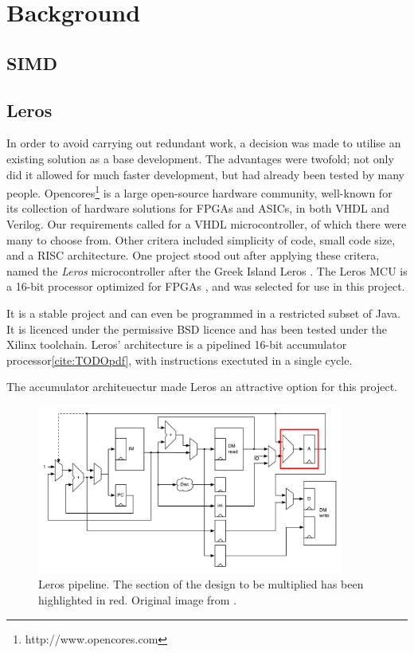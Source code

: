 \section{Background}
\subsection{SIMD}
\subsection{Leros}
In order to avoid carrying out redundant work, a decision was made to utilise an
existing solution as a base development. The advantages were twofold; not only
did it allowed for much faster development, but had already been tested by many
people. Opencores\footnote{
http://www.opencores.com
}
is a large open-source hardware community, well-known for its collection of hardware solutions for
FPGAs and ASICs, in both VHDL and Verilog. Our requirements called for a VHDL
microcontroller, of which there were many to choose from. Other critera included
simplicity of code, small code size, and a RISC architecture. One project stood out
after applying these critera, named the \emph{Leros} microcontroller after the
Greek Island Leros \cite{cite:TODO}.  The Leros MCU is a 16-bit
processor optimized for FPGAs \cite{cite:TODO}, and was selected for use in this
project.

 It is a stable
project and can even be programmed in a restricted subset of Java. It is licenced
under the permissive BSD licence and has been tested under the Xilinx toolchain.
Leros' architecture is a pipelined 16-bit accumulator processor\ref{cite:TODOpdf},
with instructions exectuted in a single cycle.

The accumulator architeuectur made Leros an attractive option for this project.

\begin{figure}[h]
\center
\includegraphics[width=0.9\textwidth]{images/leros-system}
\caption{Leros pipeline. The section of the design to be multiplied has been
highlighted in red. Original image from \cite{cite:TODO-pdf}.
}
\label{fig:leros-system}
\end{figure}
